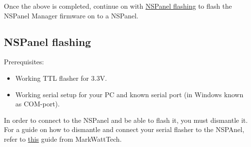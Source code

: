 \documentclass[10pt]{article}
\begin{document}
    Once the above is completed, continue on with \hyperref[sec:nspanel_flashing]{NSPanel flashing} to flash the NSPanel Manager firmware on to a NSPanel.

    \subsection{NSPanel flashing}
    \label{sec:nspanel_flashing}
    Prerequisites:
    \begin{itemize}
      \item Working TTL flasher for 3.3V.
      \item Working serial setup for your PC and known serial port (in Windows known as COM-port).
    \end{itemize}
    In order to connect to the NSPanel and be able to flash it, you must dismantle it. For a guide on how to dismantle and connect your serial flasher to the NSPAnel, refer to \href{https://www.youtube.com/watch?v=p-AK4o5jOSI}{this} guide from MarkWattTech.
\end{document}
